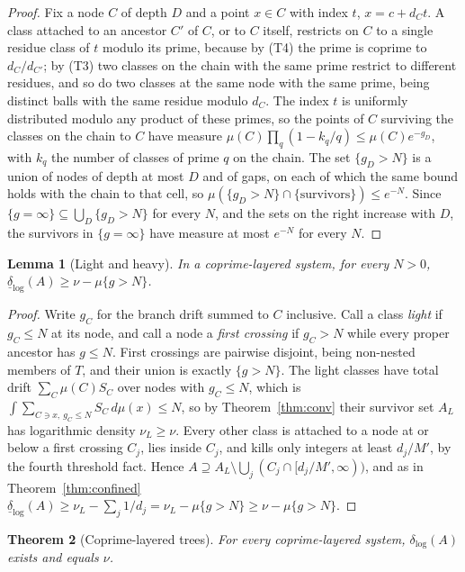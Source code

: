 \documentclass[11pt]{article}
\theoremstyle{plain}
\newtheorem{theorem}{Theorem}[section]
\newtheorem{lemma}[theorem]{Lemma}
\theoremstyle{definition}
\newcommand{\dlog}{\delta_{\log}}
\begin{document}
\begin{proof}
Fix a node $C$ of depth $D$ and a point $x\in C$ with index $t$,
$x=c+d_Ct$.  A class attached to an ancestor $C'$ of $C$, or to
$C$ itself, restricts on $C$ to a single residue class of $t$
modulo its prime, because by (T4) the prime is coprime to
$d_C/d_{C'}$; by (T3) two classes on the chain with the same
prime restrict to different residues, and so do two classes at
the same node with the same prime, being distinct balls with the
same residue modulo $d_C$.  The index $t$ is
uniformly distributed modulo any product of these primes, so the
points of $C$ surviving the classes on the chain to $C$ have
measure $\mu(C)\prod_q(1-k_q/q)\le\mu(C)e^{-g_D}$, with $k_q$
the number of classes of prime $q$ on the chain.  The set
$\{g_D>N\}$ is a union of nodes of depth at most $D$ and of
gaps, on each of which the same bound holds with the chain to
that cell, so $\mu(\{g_D>N\}\cap\{\text{survivors}\})\le e^{-N}$.
Since $\{g=\infty\}\subseteq\bigcup_D\{g_D>N\}$ for every $N$,
and the sets on the right increase with $D$, the survivors in
$\{g=\infty\}$ have measure at most $e^{-N}$ for every $N$.
\end{proof}

\begin{lemma}[Light and heavy]\label{lem:light}
In a coprime-layered system, for every $N>0$,
$\underline{\delta}_{\log}(A)\ge\nu-\mu\{g>N\}$.
\end{lemma}

\begin{proof}
Write $g_C$ for the branch drift summed to $C$ inclusive.  Call a
class \emph{light} if $g_C\le N$ at its node, and call a node a
\emph{first crossing} if $g_C>N$ while every proper ancestor has
$g\le N$.  First crossings are pairwise disjoint, being
non-nested members of $T$, and their union is exactly
$\{g>N\}$.  The light classes have total drift
$\sum_C\mu(C)S_C$ over nodes with $g_C\le N$, which is
$\int\sum_{C\ni x,\ g_C\le N}S_C\,d\mu(x)\le N$, so by
Theorem~\ref{thm:conv} their survivor set $A_L$ has logarithmic
density $\nu_L\ge\nu$.  Every other class is attached to a node
at or below a first crossing $C_j$, lies inside $C_j$, and kills
only integers at least $d_j/M'$, by the fourth threshold fact.
Hence $A\supseteq A_L\setminus\bigcup_j(C_j\cap[d_j/M',\infty))$,
and as in Theorem~\ref{thm:confined}
$\underline{\delta}_{\log}(A)\ge\nu_L-\sum_j1/d_j
=\nu_L-\mu\{g>N\}\ge\nu-\mu\{g>N\}$.
\end{proof}

\begin{theorem}[Coprime-layered trees]\label{thm:tree}
For every coprime-layered system, $\dlog(A)$ exists and equals
$\nu$.
\end{theorem}
\end{document}
